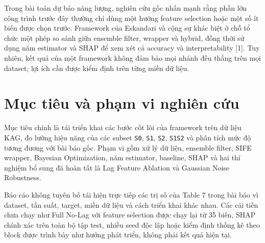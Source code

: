 Trong bài toán dự báo năng lượng, nghiên cứu gốc nhấn mạnh rằng phần lớn công trình trước đây thường chỉ dùng một hướng feature selection hoặc một số ít biến được chọn trước. Framework của Eskandari và cộng sự khác biệt ở chỗ tổ chức một phép so sánh giữa ensemble filter, wrapper và hybrid, đồng thời sử dụng năm estimator và SHAP để xem xét cả accuracy và interpretability [1]. Tuy nhiên, kết quả của một framework không đảm bảo mọi nhánh đều thắng trên mọi dataset; lợi ích cần được kiểm định trên từng miền dữ liệu.

\section{Mục tiêu và phạm vi nghiên cứu}\label{mux1ee5c-tiuxeau-vuxe0-phux1ea1m-vi-nghiuxean-cux1ee9u}

Mục tiêu chính là tái triển khai các bước cốt lõi của framework trên dữ liệu KAG, đo lường hiệu năng của các subset \texttt{S0}, \texttt{S1}, \texttt{S2}, \texttt{S1S2} và phân tích mức độ tương đương với bài báo gốc. Phạm vi gồm xử lý dữ liệu, ensemble filter, SIFE wrapper, Bayesian Optimization, năm estimator, baseline, SHAP và hai thí nghiệm bổ sung đã hoàn tất là Lag Feature Ablation và Gaussian Noise Robustness.

Báo cáo không tuyên bố tái hiện trực tiếp các trị số của Table 7 trong bài báo vì dataset, tần suất, target, miền dữ liệu và cách triển khai khác nhau. Các cải tiến chưa chạy như Full No-Lag với feature selection được chạy lại từ 35 biến, SHAP chính xác trên toàn bộ tập test, nhiều seed độc lập hoặc kiểm định thống kê theo block được trình bày như hướng phát triển, không phải kết quả hiện tại.